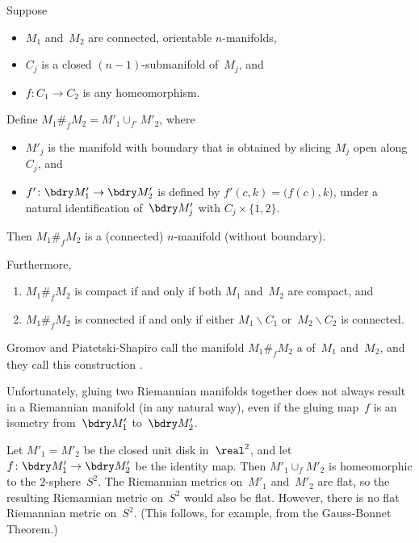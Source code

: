 \begin{cor}
 Suppose 
 \begin{itemize}
 \item $M_1$ and~$M_2$ are connected, orientable
$n$-manifolds,
 \item $C_j$ is a closed $(n-1)$-submanifold of~$M_j$, and
 \item $f \colon C_1 \to C_2$ is any homeomorphism.
 \end{itemize}
 Define $M_1 \#_f M_2 = M'_1 \cup_{f'} M'_2$, where
 \begin{itemize}
 \item $M'_j$ is the manifold with boundary that is obtained by
slicing $M_j$ open along~$C_j$, and
 \item $f' \colon \bdry M'_1 \to \bdry M'_2$ is
defined by $f'(c,k) = \bigl( f(c), k \bigr)$, under a
natural identification of~$\bdry M'_j$ with $C_j
\times \{1,2\}$.
 \end{itemize}
 Then $M_1 \#_f M_2$ is a \textup(connected\textup)
$n$-manifold \textup(without boundary\textup).

Furthermore, 
 \begin{enumerate}
 \item $M_1 \#_f M_2$ is compact if and only if both
$M_1$ and~$M_2$ are compact, and
 \item $M_1 \#_f M_2$ is connected if and only if either
$M_1 \smallsetminus C_1$ or~$M_2 \smallsetminus C_2$ is
connected.
 \end{enumerate}
 \end{cor}

\begin{terminology}
 Gromov and Piatetski-Shapiro \cite{GromovPS} call the
manifold $M_1 \#_f M_2$ a  of~$M_1$ and~$M_2$, and they call this
construction .
 \end{terminology}

Unfortunately, gluing two Riemannian manifolds together does
not always result in a Riemannian manifold (in any natural
way), even if the gluing map~$f$ is an isometry from~$\bdry
M'_1$ to~$\bdry M'_2$.

\begin{eg}
 Let $M'_1 = M'_2$ be the closed unit disk in~$\real^2$, and
let $f \colon \bdry M'_1 \to \bdry M'_2$ be the identity
map. Then $M'_1 \cup_f M'_2$ is homeomorphic to the
$2$-sphere~$S^2$. The Riemannian metrics on~$M'_1$
and~$M'_2$ are flat, so the resulting Riemannian metric
on~$S^2$ would also be flat. However, there is no flat
Riemannian metric on~$S^2$. (This follows, for example,
from the Gauss-Bonnet Theorem.) 
 \end{eg}

